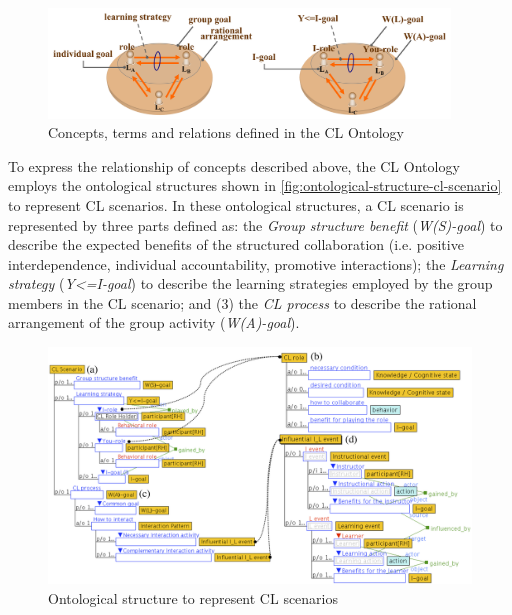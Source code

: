 \begin{figure}[!htb]
 \caption{Concepts, terms and relations defined in the CL Ontology}
 \label{fig:concepts-terms-and-relation-in-cl-ontology}
 \centering
 \includegraphics[width=0.95\textwidth]{images/chap-ontogacles1/concepts-terms-and-relation-in-cl-ontology.png}
\end{figure}

To express the relationship of concepts described above, the CL Ontology employs the ontological structures shown in \autoref{fig:ontological-structure-cl-scenario} to represent CL scenarios. In these ontological structures, a CL scenario is represented by three parts defined as:  the \emph{Group structure benefit} (\emph{W(S)-goal}) to describe the expected benefits of the structured collaboration (i.e. positive interdependence, individual accountability, promotive interactions); the \emph{Learning strategy} (\emph{Y<=I-goal}) to describe the learning strategies employed by the group members in the CL scenario; and (3) the \emph{CL process} to describe the rational arrangement of the group activity (\emph{W(A)-goal}).

\begin{figure}[!htb]
 \caption{Ontological structure to represent CL scenarios}
 \label{fig:ontological-structure-cl-scenario}
 \centering
 \includegraphics[width=1\textwidth]{images/chap-ontogacles1/ontological-structure-cl-scenario.png}
\end{figure}

